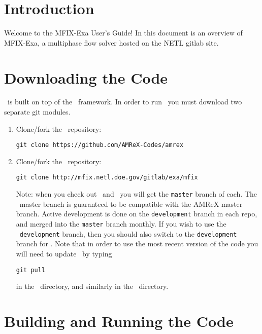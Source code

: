 
\section{Introduction}

Welcome to the MFIX-Exa User's Guide!  In this document is an overview 
of MFIX-Exa, a multiphase flow solver hosted on the NETL gitlab site. 

\section{Downloading the Code}

\mfix\ is built on top of the \amrex\ framework.  In order to run
\mfix\, you must download two separate git modules.

\vspace{.1in}

\vspace{.1in}

\begin{enumerate}

\item Clone/fork the \amrex\ repository:
\begin{verbatim}
git clone https://github.com/AMReX-Codes/amrex
\end{verbatim}

\item Clone/fork the \mfix\ repository:
\begin{verbatim}
git clone http://mfix.netl.doe.gov/gitlab/exa/mfix
\end{verbatim}

Note: when you check out \mfix\ and \amrex\, you will get the {\tt master}
branch of each.   The \mfix\ master branch is guaranteed to be compatible
with the AMReX master branch.
Active development is done on the {\tt development} branch
in each repo, and merged into the {\tt master} branch monthly.
If you wish to use the \mfix\ {\tt development} branch, then you
should also switch to the {\tt development} branch for \amrex.
Note that in order to use the most recent version of the code you 
will need to update \amrex\ by typing
\begin{verbatim}
git pull
\end{verbatim}
in the \amrex\ directory, and similarly in the \mfix\ directory.

\end{enumerate}

\section{Building and Running the Code}

